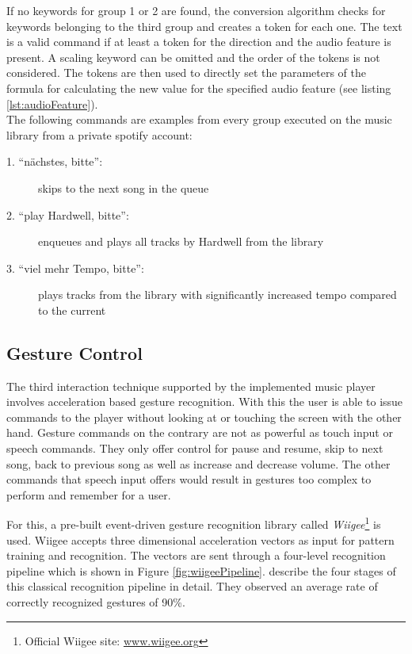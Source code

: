 If no keywords for group 1 or 2 are found, the conversion algorithm checks for keywords belonging to the third group and creates a token for each one. The text is a valid command if at least a token for the direction and the audio feature is present. A scaling keyword can be omitted and the order of the tokens is not considered. The tokens are then used to directly set the parameters of the formula for calculating the new value for the specified audio feature (see listing \ref{lst:audioFeature}).\\

The following commands are examples from every group executed on the music library from a private spotify account:
\begin{description}
	\item[1. ``n\"achstes, bitte'':] skips to the next song in the queue
	\item[2. ``play Hardwell, bitte'':] enqueues and plays all tracks by Hardwell from the library
	\item[3. ``viel mehr Tempo, bitte'':] plays tracks from the library with significantly increased tempo compared to the current
\end{description}


\subsection{Gesture Control}\label{sub:gestureControl}
The third interaction technique supported by the implemented music player involves acceleration based gesture recognition. With this the user is able to issue commands to the player without looking at or touching the screen with the other hand. Gesture commands on the contrary are not as powerful as touch input or speech commands. They only offer control for pause and resume, skip to next song, back to previous song as well as increase and decrease volume. The other commands that speech input offers would result in gestures too complex to perform and remember for a user\cite{kuhnel2011m}.

For this, a pre-built event-driven gesture recognition library called \textit{Wiigee}\footnote{Official Wiigee site: \url{www.wiigee.org}} is used. Wiigee accepts three dimensional acceleration vectors as input for pattern training and recognition. The vectors are sent through a four-level recognition pipeline which is shown in Figure \ref{fig:wiigeePipeline}. \cite{Schlomer:2008:GRW:1347390.1347395} describe the four stages of this classical recognition pipeline in detail. They observed an average rate of correctly recognized gestures of 90\%. 

